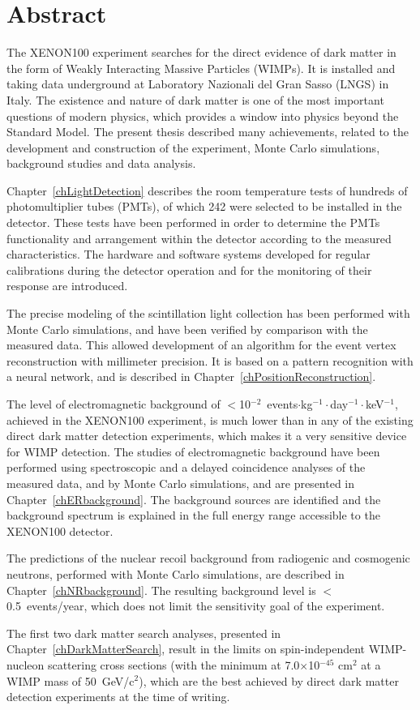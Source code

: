 \chapter*{Abstract}
\label{chAbstract}

The XENON100 experiment searches for the direct evidence of dark matter in the form of Weakly Interacting Massive Particles (WIMPs). It is installed and taking data underground at Laboratory Nazionali del Gran Sasso (LNGS) in Italy. The existence and nature of dark matter is one of the most important questions of modern physics, which provides a window into physics beyond the Standard Model. The present thesis described many achievements, related to the development and construction of the experiment, Monte Carlo simulations,  background studies and data analysis.

Chapter~\ref{chLightDetection} describes the room temperature tests of hundreds of photomultiplier tubes (PMTs), of which 242 were selected to be installed in the detector. These tests have been performed in order to determine the PMTs functionality and arrangement within the detector according to the measured characteristics. The hardware and software systems developed for regular calibrations during the detector operation and for the monitoring of their response are introduced.

The precise modeling of the scintillation light collection has been performed with Monte Carlo simulations, and have been verified by comparison with the measured data. This allowed development of an algorithm for the event vertex reconstruction with millimeter precision. It is based on a pattern recognition with a neural network, and is described in Chapter~\ref{chPositionReconstruction}.

The level of electromagnetic background of $<$10$^{-2}$~events$\cdot$kg$^{-1}\cdot$day$^{-1}\cdot$keV$^{-1}$, achieved in the XENON100 experiment, is much lower than in any of the existing direct dark matter detection experiments, which makes it a very sensitive device for WIMP detection. The studies of electromagnetic background have been performed using spectroscopic and a delayed coincidence analyses of the measured data, and by Monte Carlo simulations, and are presented in Chapter~\ref{chERbackground}. The background sources are identified and the background spectrum is explained in the full energy range accessible to the XENON100 detector.

The predictions of the nuclear recoil background from radiogenic and cosmogenic neutrons, performed with Monte Carlo simulations, are described in Chapter~\ref{chNRbackground}. The resulting background level is $<$0.5~events/year, which does not limit the sensitivity goal of the experiment.

The first two dark matter search analyses, presented in Chapter~\ref{chDarkMatterSearch}, result in the limits on spin-independent WIMP-nucleon scattering cross sections (with the minimum at 7.0$\times$10$^{-45}$ cm$^{2}$ at a WIMP mass of 50~GeV/c$^{2}$), which are the best achieved by direct dark matter detection experiments at the time of writing.

